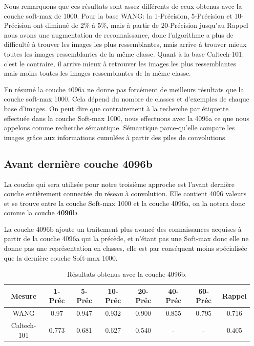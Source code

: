 	Nous remarquons que ces résultats sont assez différents de ceux obtenus avec la couche soft-max de 1000. Pour la base WANG: la 1-Précision, 5-Précision et 10-Précision ont diminué de 2\% à 5\%, mais à partir de 20-Précision jusqu'au Rappel nous avons une augmentation de reconnaissance, donc l'algorithme a plus de difficulté à trouver les images les plus ressemblantes, mais arrive à trouver mieux toutes les images ressemblantes de la même classe.
	Quant à la base Caltech-101: c'est le contraire, il arrive mieux à retrouver les images les plus ressemblantes mais moins toutes les images ressemblantes de la même classe.
	
	En résumé la couche 4096a ne donne pas forcément de meilleurs résultats que la couche soft-max 1000. Cela dépend du nombre de classes et d'exemples de chaque base d'images. On peut dire que contrairement à la recherche par étiquette effectuée dans la couche Soft-max 1000, nous effectuons avec la 4096a ce que nous appelons comme recherche sémantique. Sémantique parce-qu'elle compare les images grâce aux informations cumulées à partir des piles de convolutions.


\subsection{Avant dernière couche 4096b}
	La couche qui sera utilisée pour notre troisième approche est l'avant dernière couche entièrement connectée du réseau à convolution. Elle contient 4096 valeurs et se trouve entre la couche Soft-max 1000 et la couche 4096a, on la notera donc comme la couche \textbf{4096b}.
	
	La couche 4096b ajoute un traitement plus avancé des connaissances acquises à partir de la couche 4096a qui la précède, et n'étant pas une Soft-max donc elle ne donne pas une représentation en classes, elle est par conséquent moins spécialisée que la dernière couche Soft-max 1000.


\begin{table}[H]
\begin{center}
\begin{tabular}{|c|c|c|c|c|c|c|c|}
\hline
	Mesure & 1-Préc & 5-Préc & 10-Préc & 20-Préc & 40-Préc & 60-Préc & Rappel\\
\hline
	WANG & 0.97 & 0.947 & 0.932 & 0.900 & 0.855 & 0.795 & 0.716\\
\hline
	Caltech-101 & 0.773 & 0.681 & 0.627 & 0.540 & - & - & 0.405\\
\hline
\end{tabular}
\end{center}
\caption{Résultats obtenus avec la couche 4096b.}
\end{table}

